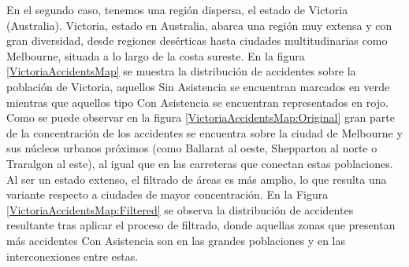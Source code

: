 En el segundo caso, tenemos una región dispersa, el estado de Victoria (Australia). Victoria, estado en Australia, abarca una región muy extensa y con gran diversidad, desde regiones desérticas hasta ciudades multitudinarias como Melbourne, situada a lo largo de la costa sureste. En la figura \ref{VictoriaAccidentsMap} se muestra la distribución de accidentes sobre la población de Victoria, aquellos Sin Asistencia se encuentran marcados en verde mientras que aquellos tipo Con Asistencia se encuentran representados en rojo. Como se puede observar en la figura \ref{VictoriaAccidentsMap:Original} gran parte de la concentración de los accidentes se encuentra sobre la ciudad de Melbourne y sus núcleos urbanos próximos (como Ballarat al oeste, Shepparton al norte o Traralgon al este), al igual que en las carreteras que conectan estas poblaciones. Al ser un estado extenso, el filtrado de áreas es más amplio, lo que resulta una variante respecto a ciudades de mayor concentración. En la Figura \ref{VictoriaAccidentsMap:Filtered} se observa la distribución de accidentes resultante tras aplicar el proceso de filtrado, donde aquellas zonas que presentan más accidentes Con Asistencia son en las grandes poblaciones y en las interconexiones entre estas.


